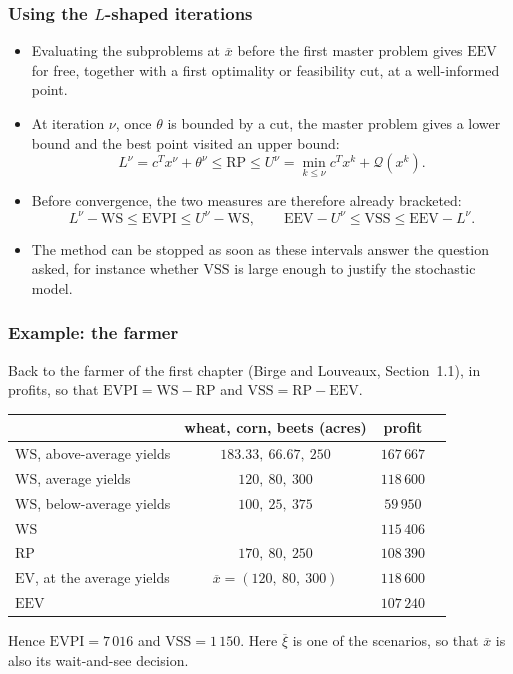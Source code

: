 \documentclass[aspectratio=169]{beamer}
\def\cQ{\mathcal{Q}}
\newcommand{\WS}{\mathrm{WS}}
\newcommand{\RP}{\mathrm{RP}}
\newcommand{\EV}{\mathrm{EV}}
\newcommand{\EEV}{\mathrm{EEV}}
\newcommand{\EVPI}{\mathrm{EVPI}}
\newcommand{\VSS}{\mathrm{VSS}}
\begin{document}
\begin{frame}
\frametitle{Using the $L$-shaped iterations}

\begin{itemize}
\item
Evaluating the subproblems at $\overline{x}$ {\red before} the first master problem gives $\EEV$ for
free, together with a first optimality or feasibility cut, at a well-informed point.
\item
At iteration $\nu$, once $\theta$ is bounded by a cut, the master problem gives a lower bound and
the best point visited an upper bound:
\[
L^{\nu} = c^Tx^{\nu} + \theta^{\nu} \leq \RP \leq U^{\nu} = \min_{k \leq \nu} c^Tx^k + \cQ(x^k).
\]
\item
Before convergence, the two measures are therefore already bracketed:
\[
L^{\nu} - \WS \leq \EVPI \leq U^{\nu} - \WS, \qquad
\EEV - U^{\nu} \leq \VSS \leq \EEV - L^{\nu}.
\]
\item
The method can be stopped as soon as these intervals answer the question asked, for instance whether
$\VSS$ is large enough to justify the stochastic model.
\end{itemize}

\end{frame}

\begin{frame}
\frametitle{Example: the farmer}

Back to the farmer of the first chapter (Birge and Louveaux, Section~1.1), in profits, so that
$\EVPI = \WS - \RP$ and $\VSS = \RP - \EEV$.

\mbox{}

\begin{center}
\begin{tabular}{lccc}
\hline
& wheat, corn, beets (acres) & profit \\
\hline
$\WS$, above-average yields & $183.33,\ 66.67,\ 250$ & $167\,667$ \\
$\WS$, average yields & $120,\ 80,\ 300$ & $118\,600$ \\
$\WS$, below-average yields & $100,\ 25,\ 375$ & $59\,950$ \\
$\WS$ & & $115\,406$ \\
\hline
$\RP$ & $170,\ 80,\ 250$ & $108\,390$ \\
$\EV$, at the average yields & $\overline{x} = (120,\ 80,\ 300)$ & $118\,600$ \\
$\EEV$ & & $107\,240$ \\
\hline
\end{tabular}
\end{center}

\mbox{}

Hence $\EVPI = 7\,016$ and $\VSS = 1\,150$. Here $\overline{\xi}$ is one of the scenarios, so that
$\overline{x}$ is also its wait-and-see decision.

\end{frame}
\end{document}
